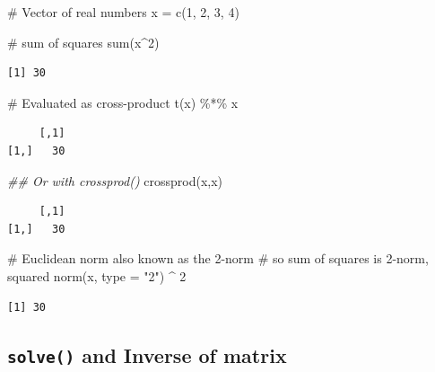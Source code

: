 \documentclass[
  letterpaper,
  DIV=11,
  numbers=noendperiod]{scrreprt}
\newenvironment{Shaded}{\begin{snugshade}}{\end{snugshade}}
\newcommand{\AttributeTok}[1]{\textcolor[rgb]{0.40,0.45,0.13}{#1}}
\newcommand{\CommentTok}[1]{\textcolor[rgb]{0.37,0.37,0.37}{#1}}
\newcommand{\DecValTok}[1]{\textcolor[rgb]{0.68,0.00,0.00}{#1}}
\newcommand{\DocumentationTok}[1]{\textcolor[rgb]{0.37,0.37,0.37}{\textit{#1}}}
\newcommand{\FunctionTok}[1]{\textcolor[rgb]{0.28,0.35,0.67}{#1}}
\newcommand{\NormalTok}[1]{\textcolor[rgb]{0.00,0.23,0.31}{#1}}
\newcommand{\OtherTok}[1]{\textcolor[rgb]{0.00,0.23,0.31}{#1}}
\newcommand{\SpecialCharTok}[1]{\textcolor[rgb]{0.37,0.37,0.37}{#1}}
\newcommand{\StringTok}[1]{\textcolor[rgb]{0.13,0.47,0.30}{#1}}
\begin{document}
\begin{Shaded}
\begin{Highlighting}[]
\CommentTok{\# Vector of real numbers}
\NormalTok{x }\OtherTok{=} \FunctionTok{c}\NormalTok{(}\DecValTok{1}\NormalTok{, }\DecValTok{2}\NormalTok{, }\DecValTok{3}\NormalTok{, }\DecValTok{4}\NormalTok{)}

\CommentTok{\# sum of squares}
\FunctionTok{sum}\NormalTok{(x}\SpecialCharTok{\^{}}\DecValTok{2}\NormalTok{)}
\end{Highlighting}
\end{Shaded}

\begin{verbatim}
[1] 30
\end{verbatim}

\begin{Shaded}
\begin{Highlighting}[]
\CommentTok{\# Evaluated as cross{-}product}
\FunctionTok{t}\NormalTok{(x) }\SpecialCharTok{\%*\%}\NormalTok{ x}
\end{Highlighting}
\end{Shaded}

\begin{verbatim}
     [,1]
[1,]   30
\end{verbatim}

\begin{Shaded}
\begin{Highlighting}[]
\DocumentationTok{\#\# Or with crossprod()}
\FunctionTok{crossprod}\NormalTok{(x,x)}
\end{Highlighting}
\end{Shaded}

\begin{verbatim}
     [,1]
[1,]   30
\end{verbatim}

\begin{Shaded}
\begin{Highlighting}[]
\CommentTok{\# Euclidean norm also known as the 2{-}norm}
\CommentTok{\# so sum of squares is 2{-}norm, squared}
\FunctionTok{norm}\NormalTok{(x, }\AttributeTok{type =} \StringTok{"2"}\NormalTok{) }\SpecialCharTok{\^{}} \DecValTok{2}
\end{Highlighting}
\end{Shaded}

\begin{verbatim}
[1] 30
\end{verbatim}

\hypertarget{sec-solve}{%
\subsection{\texorpdfstring{\texttt{solve()} and Inverse of
matrix}{solve() and Inverse of matrix}}\label{sec-solve}}
\end{document}

